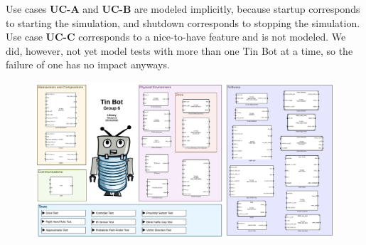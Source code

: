 \documentclass[a4paper,parskip,headheight=38pt]{scrartcl} %
\begin{document}
Use cases \textbf{UC-A} and \textbf{UC-B} are modeled implicitly, because startup corresponds to starting the simulation, and shutdown corresponds to stopping the simulation.
Use case \textbf{UC-C} corresponds to a nice-to-have feature and is not modeled. We did, however, not yet model tests with more than one Tin Bot at a time, so the failure of one has no impact anyways.

\pagestyle{empty}

\begin{landscape}
\begin{figure}[h]
\centering
\includegraphics[width=26cm]{library.pdf}
\label{}
\end{figure}
\end{landscape}
\end{document}
